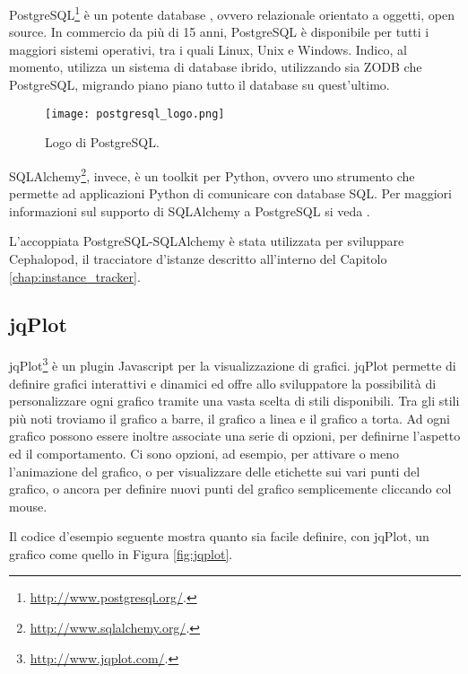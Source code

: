             PostgreSQL\footnote{\url{http://www.postgresql.org/}.} è un potente database , ovvero relazionale orientato a oggetti, open source. In commercio da più di 15 anni, PostgreSQL è disponibile per tutti i maggiori sistemi operativi, tra i quali Linux, Unix e Windows. Indico, al momento, utilizza un sistema di database ibrido, utilizzando sia \ac{ZODB} che PostgreSQL, migrando piano piano tutto il database su quest'ultimo.
            
        	\begin{figure}[h!]
        		\begin{center}
        			\texttt{[image: postgresql\_logo.png]}
        		\end{center}
        		\caption[Logo di PostgreSQL]{Logo di PostgreSQL.}
        		\label{fig:postgresql_logo}
        	\end{figure}
        	
        	SQLAlchemy\footnote{\url{http://www.sqlalchemy.org/}.}, invece, è un toolkit  per Python, ovvero uno strumento che permette ad applicazioni Python di comunicare con database \ac{SQL}. Per maggiori informazioni sul supporto di SQLAlchemy a PostgreSQL si veda \cite{sqlalchemy:postgresql}.
        	
        	L'accoppiata PostgreSQL-SQLAlchemy è stata utilizzata per sviluppare Cephalopod, il tracciatore d'istanze descritto all'interno del Capitolo \ref{chap:instance_tracker}.
        
        \subsection{jqPlot} \label{subsec:p;sl;jqplot}
        
            jqPlot\footnote{\url{http://www.jqplot.com/}.} è un plugin Javascript per la visualizzazione di grafici. jqPlot permette di definire grafici interattivi e dinamici ed offre allo sviluppatore la possibilità di personalizzare ogni grafico tramite una vasta scelta di stili disponibili. Tra gli stili più noti troviamo il grafico a barre, il grafico a linea e il grafico a torta. Ad ogni grafico possono essere inoltre associate una serie di opzioni, per definirne l'aspetto ed il comportamento. Ci sono opzioni, ad esempio, per attivare o meno l'animazione del grafico, o per visualizzare delle etichette sui vari punti del grafico, o ancora per definire nuovi punti del grafico semplicemente cliccando col mouse.
            
            Il codice d'esempio seguente mostra quanto sia facile definire, con jqPlot, un grafico come quello in Figura \ref{fig:jqplot}.
            
